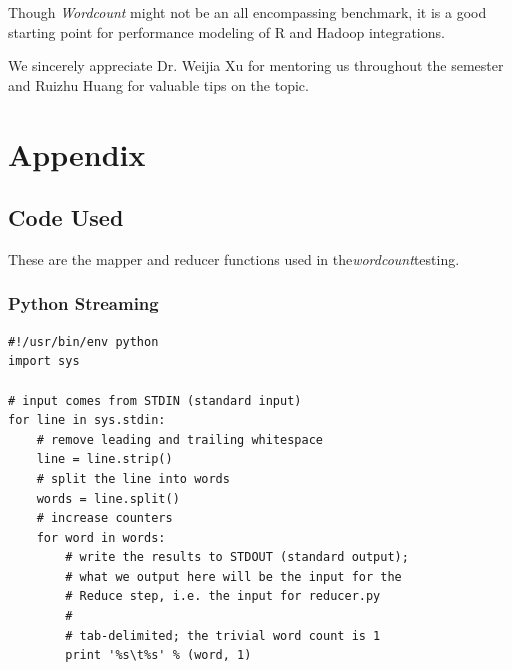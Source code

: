 \documentclass[
journal=jacsat, %
manuscript=article]{achemso}
\begin{document}
Though \textit{Wordcount} might not be an all encompassing benchmark, it is a good starting point for performance modeling of R and Hadoop integrations.


\acknowledgement
We sincerely appreciate Dr. Weijia Xu for mentoring us throughout the semester and Ruizhu Huang for valuable tips on the topic. 



\clearpage

\section{Appendix}
\subsection{Code Used}
These are the mapper and reducer functions used in the\textit{wordcount}testing.

\subsubsection{Python Streaming}
\begin{lstlisting}[caption=Mapper.py]
#!/usr/bin/env python
import sys

# input comes from STDIN (standard input)
for line in sys.stdin:
    # remove leading and trailing whitespace
    line = line.strip()
    # split the line into words
    words = line.split()
    # increase counters
    for word in words:
        # write the results to STDOUT (standard output);
        # what we output here will be the input for the
        # Reduce step, i.e. the input for reducer.py
        #
        # tab-delimited; the trivial word count is 1
        print '%s\t%s' % (word, 1)
        
\end{lstlisting}
\end{document}
